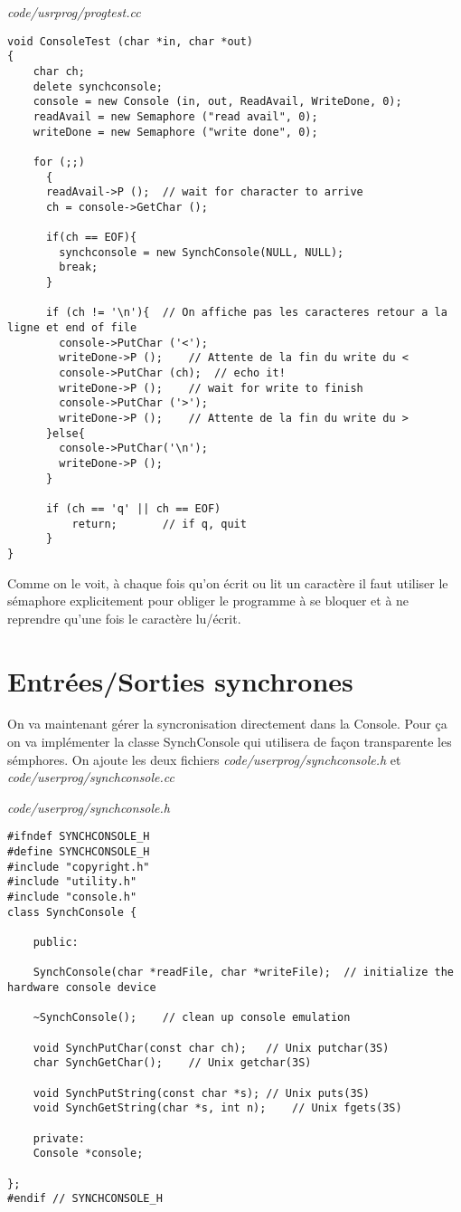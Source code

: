 \documentclass[a4paper,10pt]{article}
\begin{document}
\textit{code/usrprog/progtest.cc}
\begin{lstlisting}
void ConsoleTest (char *in, char *out)
{
    char ch;
    delete synchconsole;
    console = new Console (in, out, ReadAvail, WriteDone, 0);
    readAvail = new Semaphore ("read avail", 0);
    writeDone = new Semaphore ("write done", 0);

    for (;;)
      {
	  readAvail->P ();	// wait for character to arrive
	  ch = console->GetChar ();

	  if(ch == EOF){
	  	synchconsole = new SynchConsole(NULL, NULL);
	  	break;
	  }
 		
	  if (ch != '\n'){	// On affiche pas les caracteres retour a la ligne et end of file
		console->PutChar ('<');	
	  	writeDone->P ();	// Attente de la fin du write du <	
		console->PutChar (ch);	// echo it!
  		writeDone->P ();	// wait for write to finish
	  	console->PutChar ('>');	
	  	writeDone->P ();	// Attente de la fin du write du >
	  }else{
	  	console->PutChar('\n');
	  	writeDone->P ();
	  }

	  if (ch == 'q' || ch == EOF)
	      return;		// if q, quit
      }
}
\end{lstlisting}

Comme on le voit, à chaque fois qu'on écrit ou lit un caractère il faut
utiliser le sémaphore explicitement pour obliger le programme à se bloquer et à
ne
reprendre qu'une fois le caractère lu/écrit.

\section{Entrées/Sorties synchrones}
On va maintenant gérer la syncronisation directement dans la Console. Pour ça
on va implémenter la classe SynchConsole qui utilisera de façon
transparente les sémphores. On ajoute les deux fichiers
\textit{code/userprog/synchconsole.h} et \textit{code/userprog/synchconsole.cc}

\textit{code/userprog/synchconsole.h}
\begin{lstlisting}
#ifndef SYNCHCONSOLE_H
#define SYNCHCONSOLE_H
#include "copyright.h"
#include "utility.h"
#include "console.h"
class SynchConsole {

	public:

	SynchConsole(char *readFile, char *writeFile);	// initialize the hardware console device

	~SynchConsole();	// clean up console emulation

	void SynchPutChar(const char ch);	// Unix putchar(3S)
	char SynchGetChar();	// Unix getchar(3S)

	void SynchPutString(const char *s);	// Unix puts(3S)
	void SynchGetString(char *s, int n);	// Unix fgets(3S)

	private:
	Console *console;

};
#endif // SYNCHCONSOLE_H
\end{lstlisting}
\end{document}
